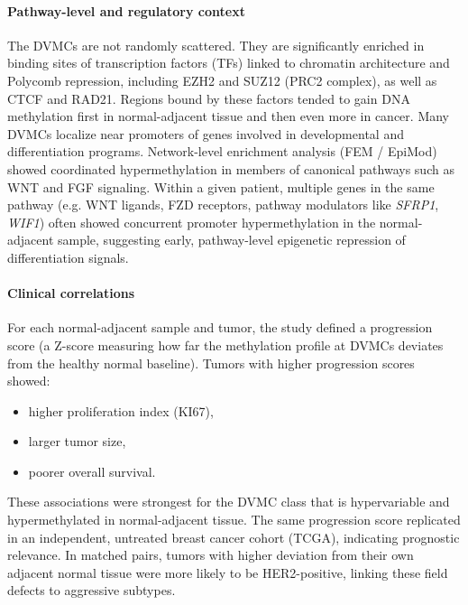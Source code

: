 \documentclass[10pt]{extarticle}
\begin{document}
\paragraph{Pathway-level and regulatory context}
The DVMCs are not randomly scattered. They are significantly enriched in binding sites of transcription factors (TFs) linked to chromatin architecture and Polycomb repression, including EZH2 and SUZ12 (PRC2 complex), as well as CTCF and RAD21. Regions bound by these factors tended to gain DNA methylation first in normal-adjacent tissue and then even more in cancer. Many DVMCs localize near promoters of genes involved in developmental and differentiation programs. Network-level enrichment analysis (FEM / EpiMod) showed coordinated hypermethylation in members of canonical pathways such as WNT and FGF signaling. Within a given patient, multiple genes in the same pathway (e.g. WNT ligands, FZD receptors, pathway modulators like \textit{SFRP1}, \textit{WIF1}) often showed concurrent promoter hypermethylation in the normal-adjacent sample, suggesting early, pathway-level epigenetic repression of differentiation signals.

\paragraph{Clinical correlations}
For each normal-adjacent sample and tumor, the study defined a progression score (a Z-score measuring how far the methylation profile at DVMCs deviates from the healthy normal baseline). Tumors with higher progression scores showed: 
\begin{itemize}[label=-]
  \item higher proliferation index (KI67),
  \item larger tumor size,
  \item poorer overall survival.
\end{itemize}

These associations were strongest for the DVMC class that is hypervariable and hypermethylated in normal-adjacent tissue. The same progression score replicated in an independent, untreated breast cancer cohort (TCGA), indicating prognostic relevance. In matched pairs, tumors with higher deviation from their own adjacent normal tissue were more likely to be HER2-positive, linking these field defects to aggressive subtypes.
\end{document}
